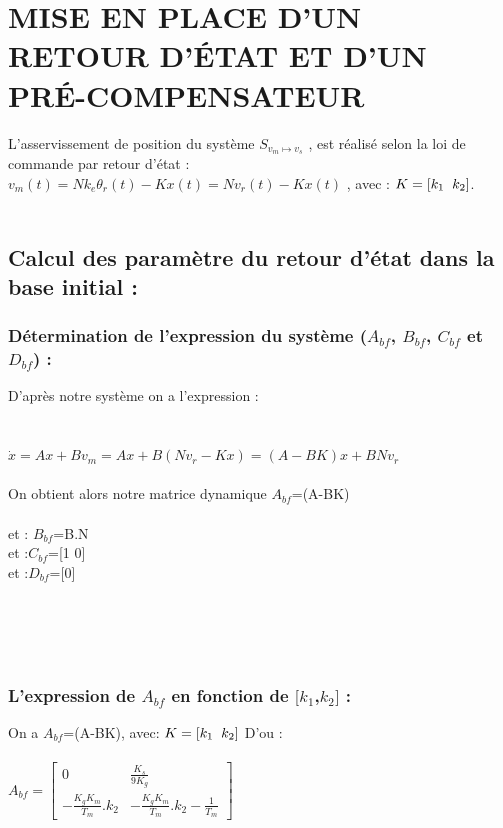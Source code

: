 \documentclass[12pt, a4paper, openany]{report}
\begin{document}
 \chapter{MISE EN PLACE D’UN RETOUR D’ÉTAT ET D’UN PRÉ-COMPENSATEUR}

L'asservissement de position du système $S_{v_{m}\longmapsto v_{s}}$ , est réalisé selon la loi de commande par retour d'état :\\
 $v_{m}(t)=Nk_{e}\theta_{r}(t)-Kx(t)=Nv_{r}(t)-Kx(t)$ , avec : $K=[k_{1} \hspace{2mm} k_{2}]$.\\\\
 
 \section{Calcul des paramètre du retour d'état dans la base initial :}
 
\subsection{Détermination de l'expression du système ($A_{bf}$, $B_{bf}$, $C_{bf}$ et $D_{bf}$) :}

D'après notre système on a l'expression :\\
\\\\
$\dot{x}=Ax+Bv_{m}=Ax+B(Nv_{r}-Kx)=(A-BK)x+BNv_{r}$
\\\\
On obtient alors notre matrice dynamique \quad $A_{bf}$=(A-BK)\\
\\
et : \quad $B_{bf}$=B.N \\
 et :\quad $C_{bf}$=[1 0] \\
 et :\quad $D_{bf}$=[0] \\\\\\\\\\

\subsection{L'expression de $A_{bf}$ en fonction de $[k_{1}$,$k_{2}]$ : }

On a $A_{bf}$=(A-BK),  avec: $K=[k_{1} \hspace{2mm} k_{2}]$
D'ou :\\\\
$A_{bf}=
\begin{bmatrix} 
0 & \frac{K_{s}}{9K_{g}} \\
-\frac{K_{g}K_{m}}{T_{m}}.k_{2} & -\frac{K_{g}K_{m}}{T_{m}}.k_{2}-\frac{1}{T_{m}}
\end{bmatrix}$ \\\\
\end{document}
